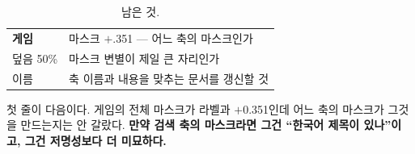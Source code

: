 \documentclass[10pt]{article}
\begin{document}
\begin{table}[t]
\centering\tsize
\caption{남은 것.}
\begin{tabular}{ll}
\toprule
\textbf{게임} & 마스크 $+$.351 --- 어느 축의 마스크인가 \\
덮음 50\% & 마스크 변별이 제일 큰 자리인가 \\
이름 & 축 이름과 내용을 맞추는 문서를 갱신할 것 \\
\bottomrule
\end{tabular}
\end{table}

첫 줄이 다음이다. 게임의 전체 마스크가 라벨과 $+$0.351인데 어느 축의
마스크가 그것을 만드는지는 안 갈랐다. \textbf{만약 검색 축의 마스크라면
그건 ``한국어 제목이 있나''이고, 그건 저명성보다 더 미묘하다.}
\end{document}
